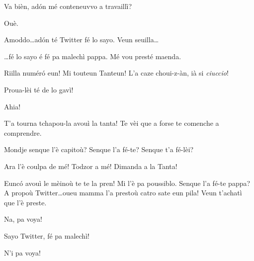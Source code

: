 \begin{drama}
\Tanteunspeaks{} Va bièn, ad\'on mé conteneuvvo a travaillì?

\Tantaspeaks Ouè.



\Alicespeaks Amoddo\ldots ad\'on té Twitter fé lo sayo. Veun seuilla\ldots


\Alicespeaks\ldots fé lo sayo é fé pa malechì pappa. Mé vou presté maenda.


\Tantaspeaks Riilla numér\'o eun! Mi touteun Tanteun! L'a caze choui-z-àn, ià si \textit{ciuccio}!

\Tanteunspeaks Proua-lèi té de lo gavì!


\Twitterspeaks Ahia!


\Tanteunspeaks{} T'a tourna tchapou-la avouì la tanta! Te vèi que a forse te comenche a comprendre.


\Alicespeaks Mondje senque l'è capitoù?  Senque l'a fé-te? Senque t'a fé-lèi?

\Tanteunspeaks Ara l'è coulpa de mé! Todzor a mé! Dimanda a la Tanta!


\Alicespeaks Eunc\'o avouì le mèinoù te te la pren! Mi l'è pa poussiblo.  Senque l'a fé-te pappa? A propoù Twitter\ldots oueu mamma l'a prestoù catro sate eun pila! Veun t'achatì que l'è preste.

\Twitterspeaks Na, pa voya!

\Alicespeaks{} Sayo Twitter, fé pa malechì!

\Twitterspeaks N'i pa voya!


\end{drama}
